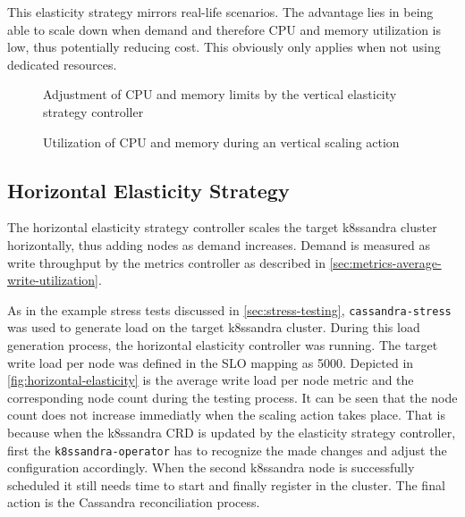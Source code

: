 This elasticity strategy mirrors real-life scenarios. The advantage lies in being able to scale down when demand and therefore CPU and memory utilization is low, thus potentially reducing cost. This obviously only applies when not using dedicated resources.

\begin{figure}
    \centering
    
    \caption{Adjustment of CPU and memory limits by the vertical elasticity strategy controller}
    \label{fig:simple-limits-vertical}
\end{figure}

\begin{figure}
    \centering
    
    \caption{Utilization of CPU and memory during an vertical scaling action}
    \label{fig:utilization-vertical}
\end{figure}

\subsection{Horizontal Elasticity Strategy}
\label{sec:evaluation-horizontal-elasticity}

The horizontal elasticity strategy controller scales the target k8ssandra cluster horizontally, thus adding nodes as demand increases. Demand is measured as write throughput by the metrics controller as described in \cref{sec:metrics-average-write-utilization}.

As in the example stress tests discussed in \cref{sec:stress-testing}, \texttt{cassandra-stress} was used to generate load on the target k8ssandra cluster. During this load generation process, the horizontal elasticity controller was running. The target write load per node was defined in the SLO mapping as 5000. Depicted in \cref{fig:horizontal-elasticity} is the average write load per node metric and the corresponding node count during the testing process. It can be seen that the node count does not increase immediatly when the scaling action takes place. That is because when the k8ssandra CRD is updated by the elasticity strategy controller, first the \texttt{k8ssandra-operator} has to recognize the made changes and adjust the configuration accordingly. When the second k8ssandra node is successfully scheduled it still needs time to start and finally register in the cluster. The final action is the Cassandra reconciliation process.

